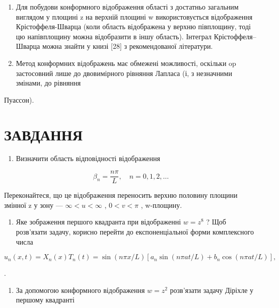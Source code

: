\documentclass[
  ukrainian,
]{article}
\providecommand{\tightlist}{%
  \setlength{\itemsep}{0pt}\setlength{\parskip}{0pt}}
\begin{document}
\begin{enumerate}
\def\labelenumi{\arabic{enumi}.}
\item
  Для побудови конформного відображення області з достатньо загальним
  виглядом у площині z на верхній площині w використовується
  відображення Крістоффеля-Шварца (коли область відображена у верхню
  півплощину, тоді цю напівплощину можна відобразити в іншу область).
  Інтеграл Крістоффеля--Шварца можна знайти у книзі {[}28{]} з
  рекомендованої літератури.
\item
  Метод конформних відображень має обмежені можливості, оскільки op
  застосовний лише до двовимірного рівняння Лапласа (і, з незначними
  змінами, до рівняння
\end{enumerate}

Пуассон).

\section{ЗАВДАННЯ}\label{ux437ux430ux432ux434ux430ux43dux43dux44f-12}

\begin{enumerate}
\def\labelenumi{\arabic{enumi}.}
\tightlist
\item
  Визначити область відповідності відображення
\end{enumerate}

\[
\beta_n = \frac{n\pi}{L}, \quad n = 0, 1, 2, \ldots
\]

Переконайтеся, що це відображення переносить верхню половину площини
змінної z у зону --- \(\infty < u < \infty\) , \(0 < v < \pi\) ,
w-площину.

\begin{enumerate}
\def\labelenumi{\arabic{enumi}.}
\setcounter{enumi}{1}
\tightlist
\item
  Яке зображення першого квадранта при відображенні \(w=z^{8}\) ? Щоб
  розв'язати задачу, корисно перейти до експоненціальної форми
  комплексного числа
\end{enumerate}

\[
u_n(x, t) = X_n(x) T_n(t) = \sin(n\pi x/L) [a_n \sin(n\pi at/L) + b_n \cos(n\pi at/L)],
\]

.

\begin{enumerate}
\def\labelenumi{\arabic{enumi}.}
\setcounter{enumi}{2}
\tightlist
\item
  За допомогою конформного відображення \(w=z^2\) розв'язати задачу
  Діріхле у першому квадранті
\end{enumerate}
\end{document}
